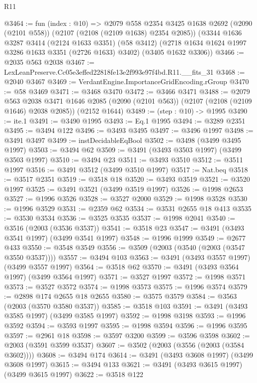 \begin{lexlean}{R11}
\begin{coremodule}
@3464 := fun (index : @10) =>
  @2079
    @558
    @2354
    @3425
    @1638
    @2692
    (@2090 (@2101 @558))
    (@2107 (@2108 (@2109 @1638) @2354 @2085))
    (@3344
      @1636
      @3287
      @3414
      (@2124 @1633 @3351)
      (@58 @3412)
      (@2718 @1634 @1624 @1997 @3286 @1633 @3351 (@2726 @1633) @3402)
      (@3405 @1632 @3306))
@3466 := @2035 @563 @2038
@3467 := LexLeanPreserve.Cc05e3effed22818fe13e2f993e97f4bd.R11.__fits_31
@3468 := @2040 @3467
@3469 := VerdantEngine.ImportanceGridEncoding.rGroup
@3470 := @58 @3469
@3471 := @3468 @3470
@3472 := @3466 @3471
@3488 := @2079
    @563
    @2038
    @3471
    @1646
    @2085
    (@2090 (@2101 @563))
    (@2107 (@2108 (@2109 @1646) @2038 @2085))
    (@2152 @1644)
@3489 := (step : @10) -> @1995
@3490 := ite.{1}
@3491 := @3490 @1995
@3493 := Eq.{1} @1995
@3494 := @3289 @2351
@3495 := @3494 @122
@3496 := @3493 @3495
@3497 := @3496 @1997
@3498 := @3491 @3497
@3499 := instDecidableEqBool
@3502 := @3498 (@3499 @3495 @1997)
@3503 := @3494 @62
@3509 := @3491 (@3493 @3503 @1997) (@3499 @3503 @1997)
@3510 := @3494 @23
@3511 := @3493 @3510
@3512 := @3511 @1997
@3516 := @3491 @3512 (@3499 @3510 @1997)
@3517 := Nat.beq
@3518 := @3517 @2351
@3519 := @3518 @18
@3520 := @3493 @3519
@3521 := @3520 @1997
@3525 := @3491 @3521 (@3499 @3519 @1997)
@3526 := @1998 @2653
@3527 := @1996 @3526
@3528 := @3527 @2000
@3529 := @1998 @3528
@3530 := @1996 @3529
@3531 := @2359 @62
@3534 := @3531 @2655 @18 @413
@3535 := @3530 @3534
@3536 := @3525 @3535
@3537 := @1998 @2041
@3540 := @3516 (@2003 (@3536 @3537))
@3541 := @3518 @23
@3547 := @3491 (@3493 @3541 @1997) (@3499 @3541 @1997)
@3548 := @1996 @1999
@3549 := @2677 @433
@3550 := @3548 @3549
@3556 := @3509 (@2003 (@3540 (@2003 (@3547 @3550 @3537))))
@3557 := @3494 @103
@3563 := @3491 (@3493 @3557 @1997) (@3499 @3557 @1997)
@3564 := @3518 @62
@3570 := @3491 (@3493 @3564 @1997) (@3499 @3564 @1997)
@3571 := @3527 @1997
@3572 := @1998 @3571
@3573 := @3527 @3572
@3574 := @1998 @3573
@3575 := @1996 @3574
@3579 := @2898 @174 @2655 @18 @2655
@3580 := @3575 @3579
@3584 := @3563 (@2003 (@3570 @3580 @3537))
@3585 := @3518 @103
@3591 := @3491 (@3493 @3585 @1997) (@3499 @3585 @1997)
@3592 := @1998 @3198
@3593 := @1996 @3592
@3594 := @3593 @1997
@3595 := @1998 @3594
@3596 := @1996 @3595
@3597 := @2961 @18
@3598 := @3597 @3200
@3599 := @3596 @3598
@3602 := @2003 (@3591 @3599 @3537)
@3607 := @3502 (@2003 (@3556 (@2003 (@3584 @3602))))
@3608 := @3494 @174
@3614 := @3491 (@3493 @3608 @1997) (@3499 @3608 @1997)
@3615 := @3494 @133
@3621 := @3491 (@3493 @3615 @1997) (@3499 @3615 @1997)
@3622 := @3518 @122

\end{coremodule}
\end{lexlean}
